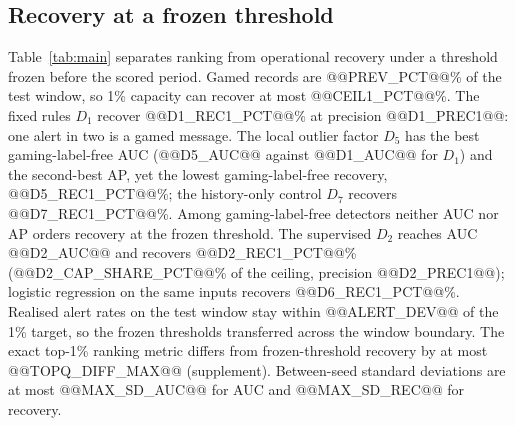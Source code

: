 \documentclass[conference]{IEEEtran}
\begin{document}
\subsection{Recovery at a frozen threshold}
Table~\ref{tab:main} separates ranking from operational recovery under a
threshold frozen before the scored period. Gamed records are @@PREV_PCT@@\% of
the test window, so 1\% capacity can recover at most @@CEIL1_PCT@@\%. The
fixed rules $D_1$ recover @@D1_REC1_PCT@@\% at precision @@D1_PREC1@@: one
alert in two is a gamed message. The local outlier factor $D_5$ has the best
gaming-label-free AUC (@@D5_AUC@@ against @@D1_AUC@@ for $D_1$) and the second-best
AP, yet the lowest gaming-label-free recovery, @@D5_REC1_PCT@@\%; the history-only
control $D_7$ recovers @@D7_REC1_PCT@@\%. Among gaming-label-free detectors neither
AUC nor AP orders recovery at the frozen threshold. The supervised $D_2$
reaches AUC @@D2_AUC@@ and recovers @@D2_REC1_PCT@@\%
(@@D2_CAP_SHARE_PCT@@\% of the ceiling, precision @@D2_PREC1@@); logistic
regression on the same inputs recovers @@D6_REC1_PCT@@\%. Realised alert
rates on the test window stay within @@ALERT_DEV@@ of the 1\% target, so the
frozen thresholds transferred across the window boundary. The exact
top-1\% ranking metric differs from frozen-threshold recovery by at most
@@TOPQ_DIFF_MAX@@ (supplement). Between-seed standard deviations are at most
@@MAX_SD_AUC@@ for AUC and @@MAX_SD_REC@@ for recovery.
\end{document}
